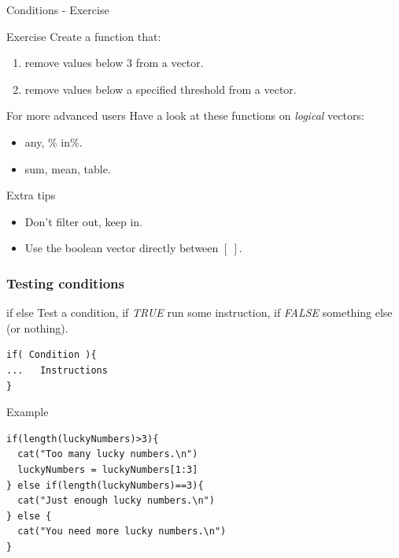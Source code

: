 \documentclass[10pt]{beamer}
\newenvironment{xframe}[2][]
  {\begin{frame}[fragile,environment=xframe,#1]
  \frametitle{#2}}
  {\end{frame}}
\begin{document}
\begin{frame}{Conditions - Exercise}
  \begin{block}{Exercise}
  Create a function that: 
  \begin{enumerate}
  \item remove values below $3$ from a {\sf vector}.
  \item  remove values below a specified threshold from a {\sf vector}.
  \end{enumerate}
  \end{block}

  \bigskip

  \begin{block}{For more advanced users}
    Have a look at these functions on {\it logical} vectors:
    \begin{itemize}
    \item any, $\%$ in$\%$.
    \item sum, mean, table.
    \end{itemize}
  \end{block}

  \bigskip

  \begin{block}{Extra tips}
    \begin{itemize}
    \item Don't filter out, keep in.
    \item Use the boolean vector directly between $[~]$.
    \end{itemize}
  \end{block}
\end{frame}



\begin{xframe}{Testing conditions}
  \begin{block}{{\sf if else}}
    Test a condition, if {\it TRUE} run some instruction, if {\it FALSE} something else (or nothing).
\begin{verbatim}
if( Condition ){
...   Instructions
} 
\end{verbatim}  
  \end{block}
  \begin{exampleblock}{Example}
\begin{verbatim}
if(length(luckyNumbers)>3){
  cat("Too many lucky numbers.\n")
  luckyNumbers = luckyNumbers[1:3]
} else if(length(luckyNumbers)==3){
  cat("Just enough lucky numbers.\n")
} else {
  cat("You need more lucky numbers.\n")
}
\end{verbatim}  
  \end{exampleblock}
\end{xframe}
\end{document}
